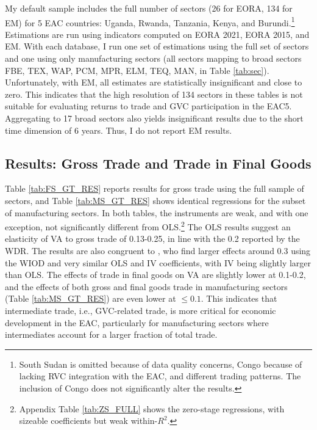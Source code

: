 \documentclass[a4paper]{article}
\begin{document}
My default sample includes the full number of sectors (26 for EORA, 134 for EM) for 5 EAC countries: Uganda, Rwanda, Tanzania, Kenya, and Burundi.\footnote{South Sudan is omitted because of data quality concerns, Congo because of lacking RVC integration with the EAC, and different trading patterns. The inclusion of Congo does not significantly alter the results. \vspace{-5mm}} Estimations are run using indicators computed on EORA 2021, EORA 2015, and EM. With each database, I run one set of estimations using the full set of sectors and one using only manufacturing sectors (all sectors mapping to broad sectors FBE, TEX, WAP, PCM, MPR, ELM, TEQ, MAN, in Table \ref{tab:sec}). Unfortunately, with EM, all estimates are statistically insignificant and close to zero. This indicates that the high resolution of 134 sectors in these tables is not suitable for evaluating returns to trade and GVC participation in the EAC5. Aggregating to 17 broad sectors also yields insignificant results due to the short time dimension of 6 years. Thus, I do not report EM results. 


\subsection{Results: Gross Trade and Trade in Final Goods}

Table \ref{tab:FS_GT_RES} reports results for gross trade using the full sample of sectors, and Table \ref{tab:MS_GT_RES} shows identical regressions for the subset of manufacturing sectors. In both tables, the instruments are weak, and with one exception, not significantly different from OLS.\footnote{Appendix Table \ref{tab:ZS_FULL} shows the zero-stage regressions, with sizeable coefficients but weak within-$R^2$. } The OLS results suggest an elasticity of VA to gross trade of 0.13-0.25, in line with the 0.2 reported by the WDR. The results are also congruent to \citet{altomonte2018trade}, who find larger effects around 0.3 using the WIOD and very similar OLS and IV coefficients, with IV being slightly larger than OLS. The effects of trade in final goods on VA are slightly lower at 0.1-0.2, and the effects of both gross and final goods trade in manufacturing sectors (Table \ref{tab:MS_GT_RES}) are even lower at $\leq 0.1$. This indicates that intermediate trade, i.e., GVC-related trade, is more critical for economic development in the EAC, particularly for manufacturing sectors where intermediates account for a larger fraction of total trade. 
\end{document}
